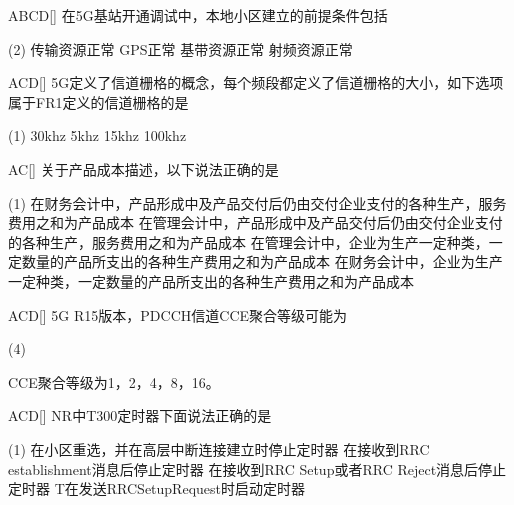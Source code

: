 \begin{choice}{\;ABCD\;}[]
    在5G基站开通调试中，本地小区建立的前提条件包括
    \begin{tasks}(2)
        \task 传输资源正常
        \task GPS正常
        \task 基带资源正常
        \task 射频资源正常
    \end{tasks}
\end{choice}

\begin{choice}{\;ACD\;}[]
    5G定义了信道栅格的概念，每个频段都定义了信道栅格的大小，如下选项属于FR1定义的信道栅格的是
    \begin{tasks}(1)
        \task 30khz
        \task 5khz
        \task 15khz
        \task 100khz
    \end{tasks}
\end{choice}

\begin{choice}{\;AC\;}[]
    关于产品成本描述，以下说法正确的是
    \begin{tasks}(1)
        \task 在财务会计中，产品形成中及产品交付后仍由交付企业支付的各种生产，服务费用之和为产品成本
        \task 在管理会计中，产品形成中及产品交付后仍由交付企业支付的各种生产，服务费用之和为产品成本
        \task 在管理会计中，企业为生产一定种类，一定数量的产品所支出的各种生产费用之和为产品成本
        \task 在财务会计中，企业为生产一定种类，一定数量的产品所支出的各种生产费用之和为产品成本
    \end{tasks}
\end{choice}


\begin{choice}{\;ACD\;}[]
    5G R15版本，PDCCH信道CCE聚合等级可能为
    \begin{tasks}(4)
    \end{tasks}
\end{choice}
\begin{solution}
    CCE聚合等级为{1，2，4，8，16}。

\end{solution}
\begin{choice}{\;ACD\;}[]
    NR中T300定时器下面说法正确的是
    \begin{tasks}(1)
        \task 在小区重选，并在高层中断连接建立时停止定时器
        \task 在接收到RRC establishment消息后停止定时器
        \task 在接收到RRC Setup或者RRC Reject消息后停止定时器
        \task T在发送RRCSetupRequest时启动定时器
    \end{tasks}
\end{choice}

